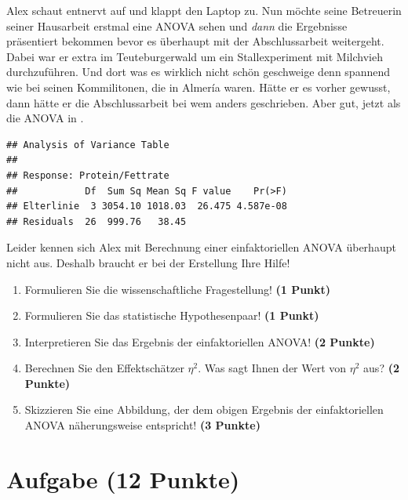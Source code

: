 \documentclass[a4paper, 9pt]{scrartcl}\usepackage[]{graphicx}\usepackage[]{xcolor}
\makeatletter
\newenvironment{kframe}{%
 \def\at@end@of@kframe{}%
 \ifinner\ifhmode%
  \def\at@end@of@kframe{\end{minipage}}%
  \begin{minipage}{\columnwidth}%
 \fi\fi%
 \def\FrameCommand##1{\hskip\@totalleftmargin \hskip-\fboxsep
 \colorbox{shadecolor}{##1}\hskip-\fboxsep
     \hskip-\linewidth \hskip-\@totalleftmargin \hskip\columnwidth}%
 \MakeFramed {\advance\hsize-\width
   \@totalleftmargin\z@ \linewidth\hsize
   \@setminipage}}%
 {\par\unskip\endMakeFramed%
 \at@end@of@kframe}
\newenvironment{knitrout}{}{} %
\makeatother
\begin{document}
Alex schaut entnervt auf und klappt den Laptop zu. Nun möchte seine Betreuerin seiner Hausarbeit erstmal eine ANOVA sehen und \textit{dann} die Ergebnisse präsentiert bekommen bevor es überhaupt mit der Abschlussarbeit weitergeht. Dabei war er extra im Teuteburgerwald um ein Stallexperiment mit Milchvieh durchzuführen. Und dort was es wirklich nicht schön geschweige denn spannend wie bei seinen Kommilitonen, die in Almería waren. Hätte er es vorher gewusst, dann hätte er die Abschlussarbeit bei wem anders geschrieben. Aber gut, jetzt als die ANOVA in \Rlogo.

\begin{knitrout}
\color{fgcolor}\begin{kframe}
\begin{verbatim}
## Analysis of Variance Table
## 
## Response: Protein/Fettrate
##            Df  Sum Sq Mean Sq F value    Pr(>F)
## Elterlinie  3 3054.10 1018.03  26.475 4.587e-08
## Residuals  26  999.76   38.45
\end{verbatim}
\end{kframe}
\end{knitrout}

\vspace{1ex}

Leider kennen sich Alex mit Berechnung einer einfaktoriellen ANOVA überhaupt nicht aus. Deshalb braucht er bei der Erstellung Ihre Hilfe! 

\begin{enumerate}
  \item Formulieren Sie die wissenschaftliche Fragestellung! \textbf{(1 Punkt)}
  \item Formulieren Sie das statistische Hypothesenpaar! \textbf{(1 Punkt)}
\item Interpretieren Sie das Ergebnis der einfaktoriellen ANOVA! \textbf{(2 Punkte)} 
\item Berechnen Sie den Effektschätzer $\eta^2$. Was sagt Ihnen der Wert von $\eta^2$ aus? \textbf{(2 Punkte)}
\item Skizzieren Sie eine Abbildung, der dem obigen Ergebnis der
  einfaktoriellen ANOVA näherungsweise entspricht! \textbf{(3 Punkte)}
\end{enumerate}

 
\clearpage

\section{Aufgabe \hfill (12 Punkte)}
\end{document}
